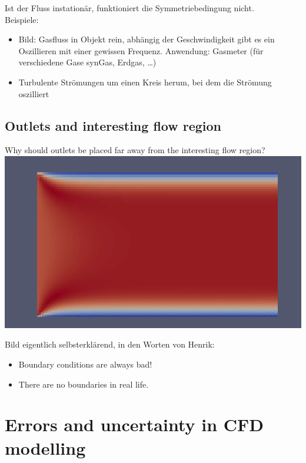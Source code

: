 \documentclass[a4paper]{scrartcl}
\begin{document}
Ist der Fluss instationär, funktioniert die Symmetriebedingung nicht.\\

Beispiele:\\
\begin{itemize}
  \item Bild: Gasfluss in Objekt rein, abhängig der Geschwindigkeit gibt es ein
  Oszillieren mit einer gewissen Frequenz. Anwendung: Gasmeter (für
  verschiedene Gase synGas, Erdgas, \ldots)
  \item Turbulente Strömungen um einen Kreis herum, bei dem die Strömung
  oszilliert
\end{itemize}

\subsection{Outlets and interesting flow region}
Why should outlets be placed far away from the interesting flow
region?\\

\includegraphics[scale=0.8]{images/inlet_error.pdf}

Bild eigentlich selbsterklärend, in den Worten von Henrik:\\
\begin{itemize}
  \item Boundary conditions are always bad!
  \item There are no boundaries in real life.
\end{itemize}


\section{Errors and uncertainty in CFD modelling}
\end{document}
